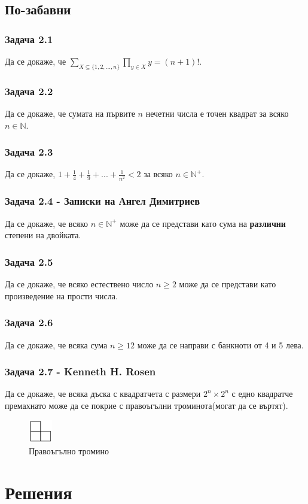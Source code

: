 \documentclass[12pt]{article}
\begin{document}
\subsection*{По-забавни}
\subsubsection*{Задача 2.1}
Да се докаже, че $\displaystyle\sum_{X \subseteq \{ 1, 2, ..., n \}} \prod_{y \in X} y = (n+1)!$.
\subsubsection*{Задача 2.2}
Да се докаже, че сумата на първите $n$ нечетни числа е точен квадрат за всяко $n \in \mathbb{N}$.
\subsubsection*{Задача 2.3}
Да се докаже, $1 + \frac{1}{4} + \frac{1}{9} + ... + \frac{1}{n^2} < 2$ за всяко $n \in \mathbb{N}^+$.
\subsubsection*{Задача 2.4 - Записки на Ангел Димитриев}
Да се докаже, че всяко $n \in \mathbb{N}^+$ може да се представи като сума на \textbf{различни} степени на двойката.
\subsubsection*{Задача 2.5}
Да се докаже, че всяко естествено число $n \geq 2$ може да се представи като произведение на прости числа.
\subsubsection*{Задача 2.6}
Да се докаже, че всяка сума $n \geq 12$ може да се направи с банкноти от 4 и 5 лева.
\subsubsection*{Задача 2.7 - Kenneth H. Rosen}
Да се докаже, че всяка дъска с квадратчета с размери $2^n \times 2^n$ с едно квадратче премахнато може да се покрие с правоъгълни троминота(могат да се въртят).
\begin{figure}[!ht]
    \caption*{Правоъгълно тромино}
    \centering
    \includegraphics[height=1cm]{right-trominoe}
\end{figure}

\section*{Решения}
\end{document}

